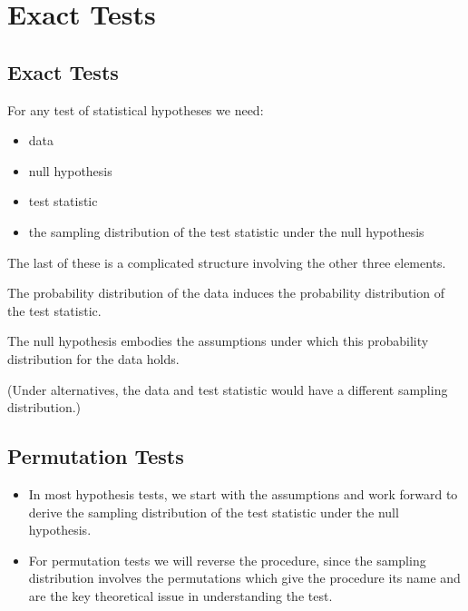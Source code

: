 \chapter{Exact Tests}\label{chap:exact}
\setcounter{page}{1}
\startcontents[chapters]
\chapcontents

\section{Exact Tests}

For any test of statistical hypotheses we need:
\begin{itemize}
\item data
\item null hypothesis
\item test statistic
\item the sampling distribution of the test statistic under the null hypothesis
\end{itemize}

The last of these is a complicated structure involving the other three elements. 

The probability distribution of the data induces the probability distribution of the test statistic. 

The null hypothesis embodies the assumptions under which this probability distribution for the data holds. 

(Under alternatives, the data and test statistic would have a different sampling distribution.)


\section{Permutation Tests}
\begin{itemize}
\item 
In most hypothesis tests, we start with the assumptions and work forward to derive the sampling distribution of the test statistic under the null hypothesis. 
\item 
For permutation tests we will reverse the procedure, since the sampling distribution involves the permutations which give the procedure its name and are the key theoretical issue in understanding the test.
\end{itemize}

